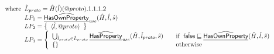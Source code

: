 \[\begin{array}{ll}
& \quad{\rm where}\begin{array}[t]{l}
  \hat{L}_{proto} = \hat{H}(\hat{l})(@proto).1.1.1.2 \\
  LP_1 = \widehat{\underline{\sf HasOwnProperty}}_{\it use}(\hat{H},\hat{l},\hat{s}) \\
  LP_2 = \left\{\begin{array}{l}\langle \hat{l}, @proto \rangle\end{array}\right\} \\
  LP_3 = \left\{
    \begin{array}{ll}
      \bigcup_{\hat{l}_{proto}\in\hat{L}_{proto}}\widehat{\underline{\sf HasProperty}}_{\it use}(\hat{H},\hat{l}_{proto},\hat{s})
      & \quad{\rm if}\begin{array}[t]{l}\hat{\mbox{\textsf{false}}} \sqsubseteq \widehat{\underline{\sf HasOwnProperty}}(\hat{H},\hat{l},\hat{s})\end{array}\\
      \left\{\begin{array}{l}\end{array}\right\} &\quad{\rm otherwise}
    \end{array}
  \right.
\end{array}
\\\\

\end{array}
\]
\newpage
